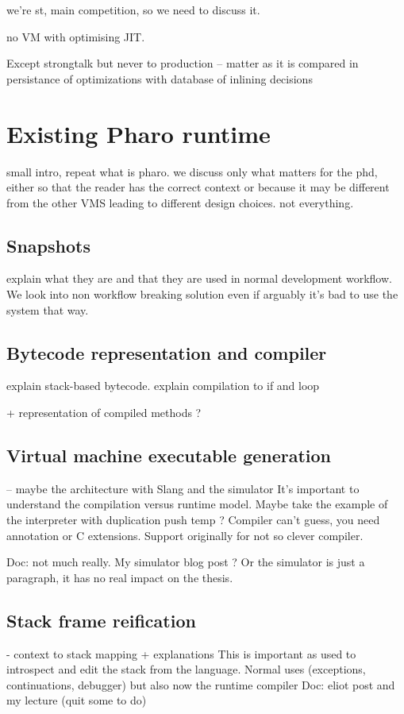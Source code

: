 \documentclass[a4paper,12pt,twoside]{../includes/ThesisStyle}
\begin{document}
we're st, main competition, so we need to discuss it.

no VM with optimising JIT.

Except strongtalk but never to production
-- matter as it is compared in persistance of optimizations with database of inlining decisions

\section{Existing Pharo runtime}

small intro, repeat what is pharo. we discuss only what matters for the phd, either so that the reader has the correct context or because it may be different from the other VMS leading to different design choices. not everything.

\subsection{Snapshots}

explain what they are and that they are used in normal development workflow. We look into non workflow breaking solution even if arguably it's bad to use the system that way.

\subsection{Bytecode representation and compiler}

explain stack-based bytecode.
explain compilation to if and loop

+ representation of compiled methods ?

\subsection{Virtual machine executable generation}
-- maybe the architecture with Slang and the simulator
It's important to understand the compilation versus runtime model.
Maybe take the example of the interpreter with duplication push temp ? Compiler can't guess, you need annotation or C extensions. Support originally for not so clever compiler.

Doc: not much really. My simulator blog post ?
Or the simulator is just a paragraph, it has no real impact on the thesis.

\subsection{Stack frame reification}
- context to stack mapping + explanations
This is important as used to introspect and edit the stack from the language. Normal uses (exceptions, continuations, debugger) but also now the runtime compiler
Doc: eliot post and my lecture (quit some to do)
\end{document}
